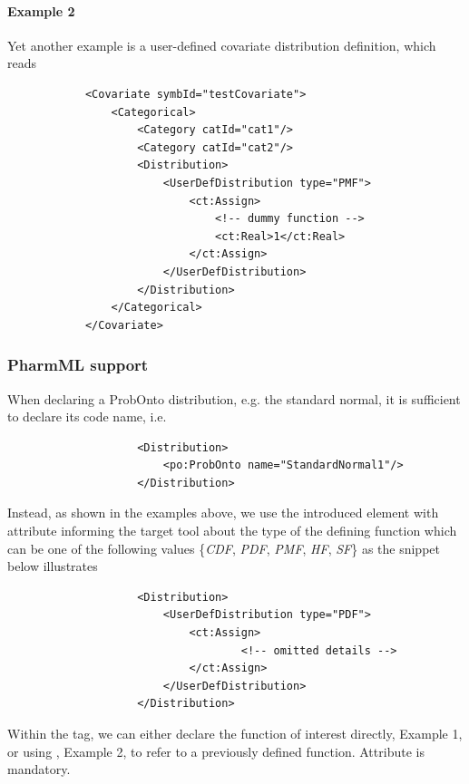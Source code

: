 \paragraph{Example 2} Yet another example is a user-defined covariate distribution definition, which reads
\lstset{language=XML}
\begin{lstlisting}
            <Covariate symbId="testCovariate">
                <Categorical>
                    <Category catId="cat1"/>
                    <Category catId="cat2"/>
                    <Distribution>
                        <UserDefDistribution type="PMF">
                            <ct:Assign>
                                <!-- dummy function -->
                                <ct:Real>1</ct:Real>
                            </ct:Assign>
                        </UserDefDistribution>
                    </Distribution>
                </Categorical>
            </Covariate>
\end{lstlisting}


\subsubsection*{PharmML support}
When declaring a ProbOnto distribution, e.g. the standard normal,
it is sufficient to declare its  code name, i.e.
\lstset{language=XML}
\begin{lstlisting}
                    <Distribution>
                        <po:ProbOnto name="StandardNormal1"/>
                    </Distribution>
\end{lstlisting}

Instead, as shown in the examples above, we use the introduced
 element with attribute informing 
the target tool about the type of the defining function which can be one of the
following values \{\emph{CDF}, \emph{PDF}, \emph{PMF}, \emph{HF}, \emph{SF}\}
as the snippet below illustrates
\lstset{language=XML}
\begin{lstlisting}
                    <Distribution>
                        <UserDefDistribution type="PDF">
                            <ct:Assign>
                                    <!-- omitted details -->
                            </ct:Assign>
                        </UserDefDistribution>
                    </Distribution>
\end{lstlisting}
Within the  tag, we can either declare the function of interest 
directly, Example 1, or using ,  Example 2, to refer to a previously 
defined function. Attribute  is mandatory.



